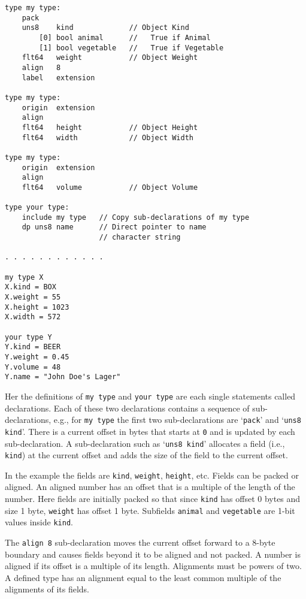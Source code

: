 \documentclass[12pt]{article}
\newenvironment{indpar}[1][0.3in]%
	{\begin{list}{}%
		     {\setlength{\itemsep}{0in}%
		      \setlength{\topsep}{0in}%
		      \setlength{\parsep}{1ex}%
		      \setlength{\labelwidth}{#1}%
		      \setlength{\leftmargin}{#1}%
		      \addtolength{\leftmargin}{\labelsep}}%
	 \item}%
	{\end{list}}
\begin{document}
\begin{indpar}\begin{verbatim}
type my type:
    pack
    uns8    kind             // Object Kind
        [0] bool animal      //   True if Animal
        [1] bool vegetable   //   True if Vegetable
    flt64   weight           // Object Weight
    align   8
    label   extension

type my type:
    origin  extension
    align
    flt64   height           // Object Height
    flt64   width            // Object Width

type my type:
    origin  extension
    align
    flt64   volume           // Object Volume

type your type:
    include my type   // Copy sub-declarations of my type
    dp uns8 name      // Direct pointer to name
                      // character string

. . . . . . . . . . . .

my type X
X.kind = BOX
X.weight = 55
X.height = 1023
X.width = 572

your type Y
Y.kind = BEER
Y.weight = 0.45
Y.volume = 48
Y.name = "John Doe's Lager"
\end{verbatim}\end{indpar}

Her the definitions of {\tt my type} and {\tt your type} are each
single statements called declarations.  Each of these two
declarations contains a sequence of sub-declarations, e.g.,
for {\tt my type} the first two sub-declarations are
`{\tt pack}' and `{\tt uns8 kind}'.  There is a current
offset in bytes that starts at {\tt 0} and is updated by each sub-declaration.
A sub-declaration such as `{\tt uns8 kind}' allocates a field
(i.e., {\tt kind})
at the current offset and adds the size of the field to the
current offset.

In the example the fields are {\tt kind}, {\tt weight}, {\tt height}, etc.
Fields can be packed or aligned.  An aligned number has an offset
that is a multiple of the length of the number.
Here fields are initially packed
so that since {\tt kind} has offset 0 bytes and size 1 byte,
{\tt weight} has offset 1 byte.  Subfields {\tt animal}
and {\tt vegetable} are 1-bit values inside {\tt kind}.

The {\tt align 8} sub-declaration moves the current offset
forward to a 8-byte boundary and causes fields beyond it
to be aligned and not packed.  A number is aligned if
its offset is a multiple of its length.  Alignments must be powers of two.
A defined type has an
alignment equal to the least common multiple of the
alignments of its fields.
\end{document}
